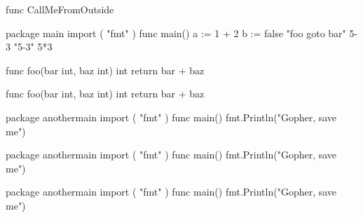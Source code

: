 \documentclass[10pt]{article}
\begin{document}
\begin{minipage}[t]{.25\textwidth}
\begin{codebox}
\begin{gocode}
            func CallMeFromOutside
        \end{gocode}
	\end{codebox}
    \begin{codebox}[Intro]
        \begin{gocode}
            package main
            import (
            "fmt"
            )
            func main() {
                a := 1 + 2
                b := false
                "foo goto bar"
                5-3
                "5-3"
                5*3
            }
        \end{gocode}
    \end{codebox}
    \begin{codebox}[More]
        \begin{gocode}
            func foo(bar int, baz int) int {
                return bar + baz
            }
        \end{gocode}
    \end{codebox}
    \begin{codebox}[more2]
        \begin{gocode}
            func foo(bar int, baz int) int {
                return bar + baz
            }
        \end{gocode}
    \end{codebox}
    \begin{codebox}
        \begin{gocode}
            package anothermain
            import (
            "fmt"
            )
            func main() {
                fmt.Println("Gopher, save me")
            }
        \end{gocode}
    \end{codebox}
\end{minipage}%
\begin{minipage}[t]{.25\textwidth}
    \begin{codebox}
        \begin{gocode}
            package anothermain
            import (
            "fmt"
            )
            func main() {
                fmt.Println("Gopher, save me")
            }
        \end{gocode}
    \end{codebox}
\end{minipage}%
\begin{minipage}[t]{.25\textwidth}
    \begin{codebox}
        \begin{gocode}
            package anothermain
            import (
            "fmt"
            )
            func main() {
                fmt.Println("Gopher, save me")
            }
        \end{gocode}
    \end{codebox}
\end{minipage}%
\end{document}
